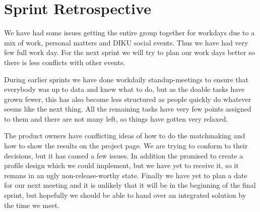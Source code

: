 \section{Sprint Retrospective}

We have had some issues getting the entire group together for workdays due
to a mix of work, personal matters and DIKU social events. Thus we have
had very few full work day. For the next sprint we will try to plan our
work days better so there is less conflicts with other events.

During earlier sprints we have done workdaily standup-meetings to ensure
that everybody was up to data and knew what to do, but as the doable tasks
have grown fewer, this has also become less structured as people quickly
do whatever seems like the next thing. All the remaining tasks have very
few points assigned to them and there are not many left, so things have
gotten very relaxed.

The product owners have conflicting ideas of how to do the matchmaking and
how to show the results on the project page. We are trying to conform to
their decisions, but it has caused a few issues. In addition the promised
to create a profile design which we could implement, but we have yet to
receive it, so it remans in an ugly non-release-worthy state. Finally we
have yet to plan a date for our next meeting and it is unlikely that it
will be in the beginning of the final sprint, but hopefully we should be
able to hand over an integrated solution by the time we meet.


